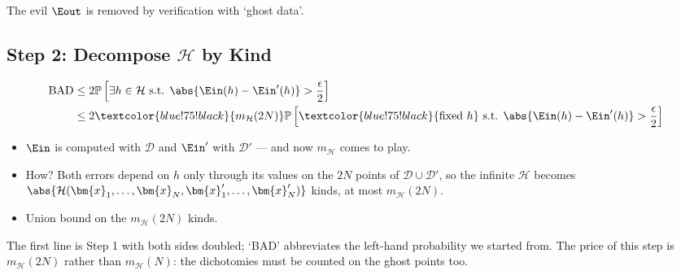 \begin{moral}
    The evil \(\Eout\) is removed by verification with `ghost data'.
\end{moral}

\subsection{Step 2: Decompose \texorpdfstring{\(\mathcal{H}\)}{H} by Kind}

\begin{align*}
    \text{BAD}
    &\le 2 \mathbb{P}\left[ \exists h \in \mathcal{H} \text{ s.t. }
    \abs{\Ein(h) - \Ein'(h)} > \frac{\epsilon}{2} \right]\\
    &\le 2 \textcolor{blue!75!black}{m_{\mathcal{H}}(2N)}
    \mathbb{P}\left[ \textcolor{blue!75!black}{\text{fixed } h} \text{ s.t. }
    \abs{\Ein(h) - \Ein'(h)} > \frac{\epsilon}{2} \right]
\end{align*}

\begin{itemize}
    \item \(\Ein\) is computed with \(\mathcal{D}\) and \(\Ein'\) with
        \(\mathcal{D}'\) --- and now \(m_{\mathcal{H}}\) comes to play.
    \item How? Both errors depend on \(h\) only through its values on the
        \(2N\) points of \(\mathcal{D} \cup \mathcal{D}'\), so the infinite
        \(\mathcal{H}\) becomes \(\abs{\mathcal{H}(\bm{x}_1, \dots , \bm{x}_N,
        \bm{x}_1', \dots , \bm{x}_N')}\) kinds, at most
        \(m_{\mathcal{H}}(2N)\).
    \item Union bound on the \(m_{\mathcal{H}}(2N)\) kinds.
\end{itemize}

The first line is Step 1 with both sides doubled; `BAD' abbreviates the
left-hand probability we started from. The price of this step is
\(m_{\mathcal{H}}(2N)\) rather than \(m_{\mathcal{H}}(N)\): the dichotomies
must be counted on the ghost points too.


